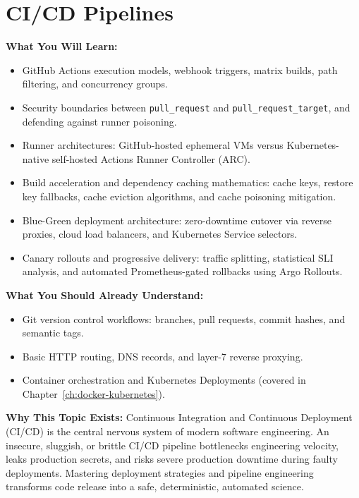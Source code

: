 \chapter{CI/CD Pipelines}
\label{ch:cicd-pipelines}

\begin{chaptergoalsbox}
\textbf{What You Will Learn:}
\begin{itemize}[leftmargin=12pt]
  \item GitHub Actions execution models, webhook triggers, matrix builds, path filtering, and concurrency groups.
  \item Security boundaries between \texttt{pull\_request} and \texttt{pull\_request\_target}, and defending against runner poisoning.
  \item Runner architectures: GitHub-hosted ephemeral VMs versus Kubernetes-native self-hosted Actions Runner Controller (ARC).
  \item Build acceleration and dependency caching mathematics: cache keys, restore key fallbacks, cache eviction algorithms, and cache poisoning mitigation.
  \item Blue-Green deployment architecture: zero-downtime cutover via reverse proxies, cloud load balancers, and Kubernetes Service selectors.
  \item Canary rollouts and progressive delivery: traffic splitting, statistical SLI analysis, and automated Prometheus-gated rollbacks using Argo Rollouts.
\end{itemize}

\textbf{What You Should Already Understand:}
\begin{itemize}[leftmargin=12pt]
  \item Git version control workflows: branches, pull requests, commit hashes, and semantic tags.
  \item Basic HTTP routing, DNS records, and layer-7 reverse proxying.
  \item Container orchestration and Kubernetes Deployments (covered in Chapter~\ref{ch:docker-kubernetes}).
\end{itemize}

\textbf{Why This Topic Exists:}
Continuous Integration and Continuous Deployment (CI/CD) is the central nervous system of modern software engineering. An insecure, sluggish, or brittle CI/CD pipeline bottlenecks engineering velocity, leaks production secrets, and risks severe production downtime during faulty deployments. Mastering deployment strategies and pipeline engineering transforms code release into a safe, deterministic, automated science.


\end{chaptergoalsbox}
